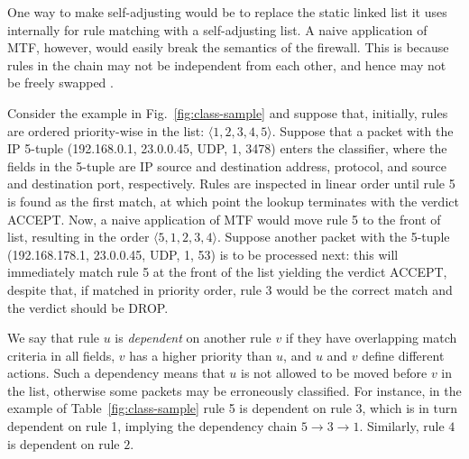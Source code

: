 One way to make \nftables self-adjusting would be to replace the static linked list it uses internally for rule matching with a self-adjusting list. A naive application of MTF, however, would easily break the semantics of the firewall. This is because rules in the chain may not be independent from each other, and hence may not be freely swapped \cite{10.1145/2619239.2626294}.

Consider the example in Fig.~\ref{fig:class-sample} and suppose that, initially, rules are ordered priority-wise in the list: $\langle1, 2, 3, 4, 5\rangle$. Suppose that a packet with the IP 5-tuple (192.168.0.1, 23.0.0.45, UDP, 1, 3478) enters the classifier, where the fields in the 5-tuple are IP source and destination address, protocol, and source and destination port, respectively. Rules are inspected in linear order until rule 5 is found as the first match, at which point the lookup terminates with the verdict ACCEPT. Now, a naive application of MTF would move rule 5 to the front of list, resulting in the order $\langle5, 1, 2, 3, 4\rangle$. Suppose another packet with the 5-tuple (192.168.178.1, 23.0.0.45, UDP, 1, 53) is to be processed next: this will immediately match rule 5 at the front of the list yielding the verdict ACCEPT, despite that, if matched in priority order, rule 3 would be the correct match and the verdict should be DROP. %

We say that rule $u$ is \emph{dependent} on another rule $v$ if they have overlapping match criteria in all fields, $v$ has a higher priority than $u$, and $u$ and $v$ define different actions. Such a dependency means that $u$ is not allowed to be moved before $v$ in the list, otherwise some packets may be erroneously classified. For instance, in the example of Table~\ref{fig:class-sample} rule 5 is dependent on rule 3, which is in turn dependent on rule 1, implying the dependency chain $5\to 3\to 1$. Similarly, rule $4$ is dependent on rule $2$. %


